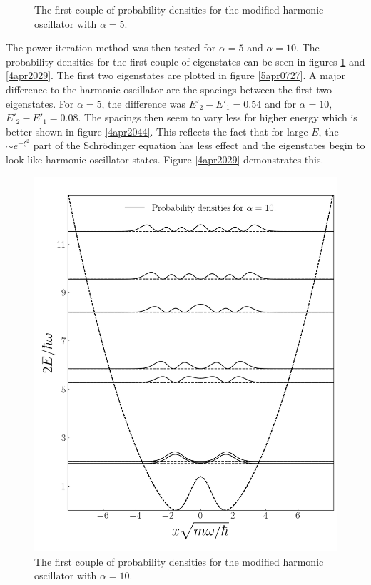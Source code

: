 \documentclass[twocolumn]{article}
\begin{document}
\begin{large}
\begin{figure}[b!]
    \caption{The first couple of probability densities for the modified harmonic oscillator with $\alpha=5$.}
    \label{4apr2003}
\end{figure}
The power iteration method was then tested for $\alpha=5$ and $\alpha=10$. The probability densities for the first couple of eigenstates can be seen in figures \ref{4apr2003} and \ref{4apr2029}. The first two eigenstates are plotted in figure \ref{5apr0727}. A major difference to the harmonic oscillator are the spacings between the first two eigenstates. For $\alpha=5$, the difference was $E'_2-E'_1 = 0.54$ and for $\alpha=10$, $E'_2-E'_1 = 0.08$. The spacings then seem to vary less for higher energy which is better shown in figure \ref{4apr2044}. This reflects the fact that for large $E$, the $\sim e^{-\xi^2}$ part of the Schrödinger equation has less effect and the eigenstates begin to look like harmonic oscillator states. Figure \ref{4apr2029} demonstrates this.
\begin{figure}
    \centering
    \includegraphics[scale=0.37]{alpha10_density.png}
    \caption{The first couple of probability densities for the modified harmonic oscillator with $\alpha=10$.}

\end{figure}
\end{large}
\end{document}
